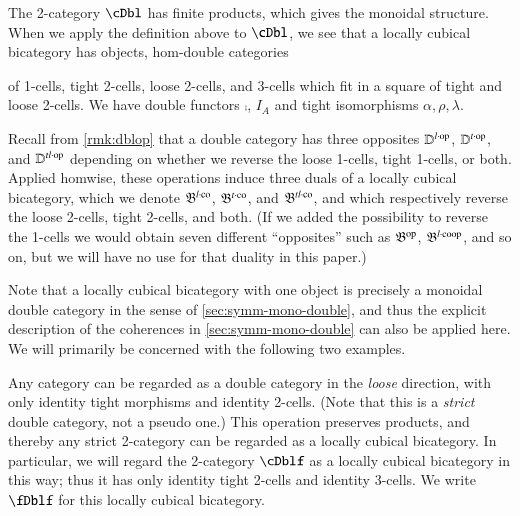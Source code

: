 The 2-category $\cDbl$ has finite products, which gives the monoidal structure. 
When we apply the definition above to $\cDbl$, we see that a locally cubical bicategory has objects, hom-double categories {of 1-cells, tight 2-cells, loose 2-cells, and 3-cells which fit in a square of tight and loose 2-cells. We have double functors $\comp$, $I_A$ and tight isomorphisms $\alpha, \rho, \lambda$.
  
\begin{rmk}\label{rmk:lcbop}
  Recall from \autoref{rmk:dblop} that a double category has three opposites $\mathbb{D}^{l\cdot\mathrm{op}}$, $\mathbb{D}^{t\cdot\mathrm{op}}$, and $\mathbb{D}^{tl\cdot\mathrm{op}}$ depending on whether we reverse the loose 1-cells, tight 1-cells, or both.
  Applied homwise, these operations induce three duals of a locally cubical bicategory, which we denote $\mathfrak{B}^{l\cdot\mathrm{co}}$, $\mathfrak{B}^{t\cdot\mathrm{co}}$, and $\mathfrak{B}^{tl\cdot\mathrm{co}}$, and which respectively reverse the loose 2-cells, tight 2-cells, and both.
  (If we added the possibility to reverse the 1-cells we would obtain seven different ``opposites'' such as $\mathfrak{B}^{\mathrm{op}}$, $\mathfrak{B}^{l\cdot\mathrm{coop}}$, and so on, but we will have no use for that duality in this paper.)
\end{rmk}

Note that a locally cubical bicategory with one object is precisely a monoidal double category in the sense of \cref{sec:symm-mono-double}, and thus the explicit description of the coherences in \cref{sec:symm-mono-double} can also be applied here.
We will primarily be concerned with the following two examples.

\begin{eg}
  Any category can be regarded as a double category in the \emph{loose} direction, with only identity tight morphisms and identity 2-cells.
  (Note that this is a \emph{strict} double category, not a pseudo one.)
  This operation preserves products, and thereby any strict 2-category can be regarded as a locally cubical bicategory.
  In particular, we will regard the 2-category $\cDblf$ as a locally cubical bicategory in this way; thus it has only identity tight 2-cells and identity 3-cells. We write $\fDblf$ for this locally cubical bicategory.
\end{eg}

}
